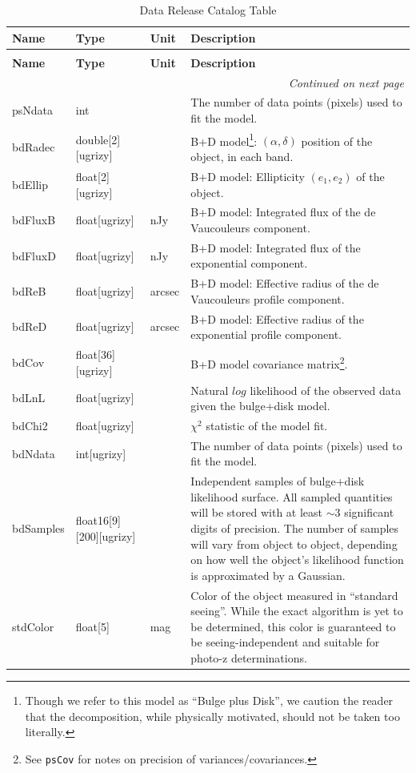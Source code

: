 \documentclass[SE,lsstdraft,toc]{lsstdoc}
\newenvironment{schema}[3]{%
\setlength\LTleft{0pt}
\setlength\LTright{\fill}
\begin{longtable}{p{0.2\textwidth}p{0.14\textwidth}p{0.14\textwidth}p{0.41\textwidth}}

\caption[#1]{#2\label{#3}}\\

\hline \textbf{Name} & \textbf{Type} & \textbf{Unit} & \textbf{Description}\\ \hline
\endfirsthead

\caption[#1]{#2}\\

\hline \textbf{Name} & \textbf{Type} & \textbf{Unit} & \textbf{Description}\\ \hline
\endhead

\hline \multicolumn{4}{r}{\emph{Continued on next page}} \\
\endfoot

\hline\hline
\endlastfoot
}{%
\hline
\end{longtable}
}
\begin{document}
\begin{schema}{\Object Table}{Data Release Catalog \Object Table}{tbl:objectTable}
psNdata & int & ~ & The number of data points (pixels) used to fit the model. \\


bdRadec & double[2][ugrizy] & ~ & B+D model\footnote{Though we refer to this model as ``Bulge plus Disk'', we caution the reader that the decomposition, while physically motivated, should not be taken too literally.}: $(\alpha, \delta)$ position of the object, in each band. \\

bdEllip & float[2][ugrizy] & ~ & B+D model: Ellipticity $(e_1, e_2)$ of the object. \\

bdFluxB & float[ugrizy] & nJy & B+D model: Integrated flux of the de Vaucouleurs component. \\

bdFluxD & float[ugrizy] & nJy & B+D model: Integrated flux of the exponential component. \\

bdReB & float[ugrizy] & arcsec & B+D model: Effective radius of the de Vaucouleurs profile component. \\

bdReD & float[ugrizy] & arcsec & B+D model: Effective radius of the exponential profile component. \\

bdCov & float[36][ugrizy] & ~ & B+D model covariance matrix\footnote{See \texttt{psCov} for notes on precision of variances/covariances.}. \\

bdLnL & float[ugrizy] & ~ & Natural $log$ likelihood of the observed data given the bulge+disk model. \\

bdChi2 & float[ugrizy] & ~ & $\chi^2$ statistic of the model fit. \\

bdNdata & int[ugrizy] & ~ & The number of data points (pixels) used to fit the model. \\

bdSamples & float16[9][200][ugrizy] & ~ & Independent samples of bulge+disk likelihood surface. All sampled quantities will be stored with at least $\sim$3 significant digits of precision. The number of samples will vary from object to object, depending on how well the object's likelihood function is approximated by a Gaussian.\\

stdColor & float[5] & mag & Color of the object measured in ``standard seeing''. While the exact algorithm is yet to be determined, this color is guaranteed to be seeing-independent and suitable for photo-z determinations.\\


\end{schema}
\end{document}
